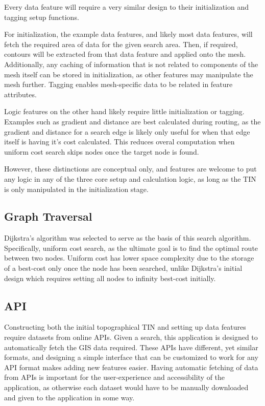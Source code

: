 \documentclass[12pt]{article}
\begin{document}
Every data feature will require a very similar design to their initialization and tagging setup functions.

For initialization, the example data features, and likely most data features, will fetch the required area of data for the given search area. Then, if required, contours will be extracted from that data feature and applied onto the mesh. Additionally, any caching of information that is not related to components of the mesh itself can be stored in initialization, as other features may manipulate the mesh further. Tagging enables mesh-specific data to be related in feature attributes.

Logic features on the other hand likely require little initialization or tagging. Examples such as gradient and distance are best calculated during routing, as the gradient and distance for a search edge is likely only useful for when that edge itself is having it's cost calculated. This reduces overal computation when uniform cost search skips nodes once the target node is found.

However, these distinctions are conceptual only, and features are welcome to put any logic in any of the three core setup and calculation logic, as long as the TIN is only manipulated in the initialization stage.

\subsection{Graph Traversal}

Dijkstra's algorithm was selected to serve as the basis of this search algorithm. Specifically, uniform cost search, as the ultimate goal is to find the optimal route between two nodes. Uniform cost has lower space complexity due to the storage of a best-cost only once the node has been searched, unlike Dijkstra's initial design which requires setting all nodes to infinity best-cost initially.

\subsection{API}

Constructing both the initial topographical TIN and setting up data features require datasets from online APIs. Given a search, this application is designed to automatically fetch the GIS data required. These APIs have different, yet similar formats, and designing a simple interface that can be customized to work for any API format makes adding new features easier. Having automatic fetching of data from APIs is important for the user-experience and accessibility of the application, as otherwise each dataset would have to be manually downloaded and given to the application in some way.
\end{document}
